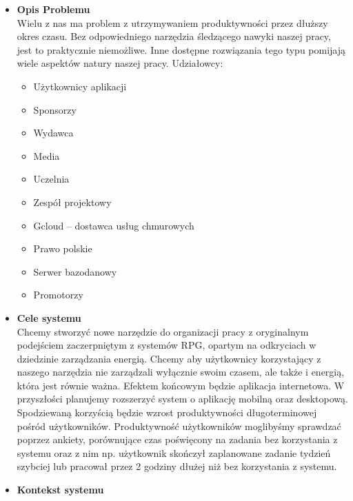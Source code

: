 \documentclass[a4paper,11pt]{report}
\begin{document}
\begin{itemize}
	\item \textbf{Opis Problemu}\\
	Wielu z nas ma problem z utrzymywaniem produktywności przez dłuższy okres czasu. Bez odpowiedniego narzędzia śledzącego nawyki naszej pracy, jest to praktycznie niemożliwe. Inne dostępne rozwiązania tego typu pomijają wiele aspektów natury naszej pracy.
Udziałowcy:
	\begin{itemize}
		\item Użytkownicy aplikacji
		\item Sponsorzy
		\item Wydawca
		\item Media
		\item Uczelnia
		\item Zespół projektowy
		\item Gcloud – dostawca usług chmurowych
		\item Prawo polskie
		\item Serwer bazodanowy
		\item Promotorzy
	\end{itemize}
	\item \textbf{Cele systemu}\\
	Chcemy stworzyć nowe narzędzie do organizacji pracy z oryginalnym podejściem zaczerpniętym z systemów RPG, opartym na odkryciach w dziedzinie zarządzania energią\cite{Harward}. Chcemy aby użytkownicy korzystający z naszego narzędzia nie zarządzali wyłącznie swoim czasem, ale także i energią, która jest równie ważna. Efektem końcowym będzie aplikacja internetowa. W przyszłości planujemy rozszerzyć system o aplikację mobilną oraz desktopową. Spodziewaną korzyścią będzie wzrost produktywności długoterminowej pośród użytkowników. Produktywność użytkowników moglibyśmy sprawdzać poprzez ankiety, porównujące czas poświęcony na zadania bez korzystania z systemu oraz z nim np. użytkownik skończył zaplanowane zadanie tydzień szybciej lub pracował przez 2 godziny dłużej niż bez korzystania z systemu.\\
	\item \textbf{Kontekst systemu}\\

\end{itemize}
\end{document}
